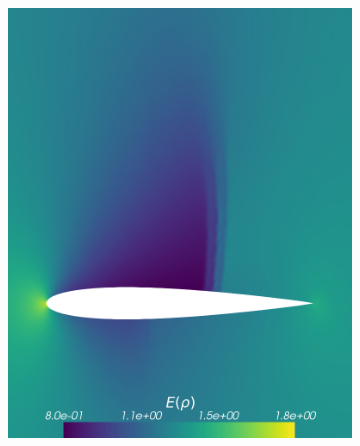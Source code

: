 \begin{figure}[h!]
\centering
	\begin{subfigure}{0.3\linewidth}
		\centering
		\includegraphics[scale=0.2]{figs/Euler1DPlots5/EulerSC5-2Res1e-6_ERho.png}
		\label{fig:sub1}
	\end{subfigure}%
	\hfill
	\begin{subfigure}{0.3\linewidth}
		\centering

\end{subfigure}
\end{figure}
